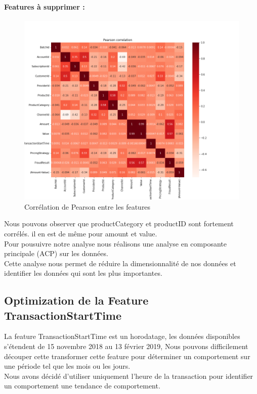 \documentclass{article}
\begin{document}
\paragraph{Features à supprimer :}
\begin{figure}[h]
    \centering
    \includegraphics[scale=0.4]{./images/correlation_pearson.png}
    \caption{Corrélation de Pearson entre les features} 
\end{figure}





Nous pouvons observer que productCategory et productID sont fortement corrélés.
il en est de même pour amount et value.\\

Pour pousuivre notre analyse nous réalisons une analyse en composante principale (ACP) sur les données.\\
Cette analyse nous permet de réduire la dimensionnalité de nos données et identifier les données qui sont les plus importantes.\\

\subsection{Optimization de la Feature TransactionStartTime}

La feature TransactionStartTime est un horodatage, les données disponibles s'étendent de 15 novembre 2018 au 13 février 2019,
Nous pouvons difficilement découper cette transformer cette feature pour déterminer un comportement sur une période tel que les mois ou les jours.\\
Nous avons décidé d'utiliser uniquement l'heure de la transaction pour identifier un comportement une tendance de comportement. \\
\end{document}
